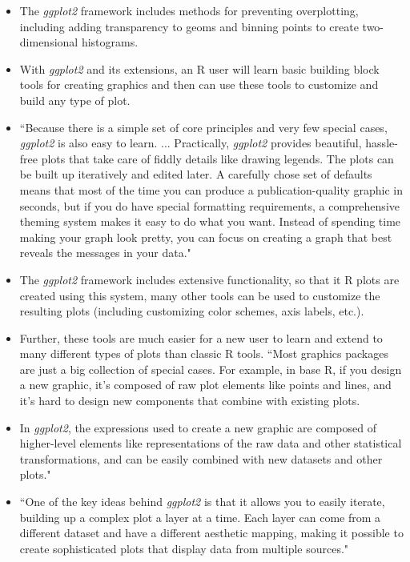 \documentclass[pdftex,english,11pt,parskip=half]{scrartcl}
\begin{document}
\begin{itemize}
\item The \textit{ggplot2} framework includes methods for preventing overplotting, including adding transparency to geoms and binning points to create two-dimensional histograms. \cite{wickham2016ggplot2} 
\item With \textit{ggplot2} and its extensions, an R user will learn basic building block tools for creating graphics and then can use these tools to customize and build any type of plot. 
\item ``Because there is a simple set of core principles and very few special cases, \textit{ggplot2} is also easy to learn. ... Practically, \textit{ggplot2} provides beautiful, hassle-free plots that take care of fiddly details like drawing legends. The plots can be built up iteratively and edited later. A carefully chose set of defaults means that most of the time you can produce a publication-quality graphic in seconds, but if you do have special formatting requirements, a comprehensive theming system makes it easy to do what you want. Instead of spending time making your graph look pretty, you can focus on creating a graph that best reveals the messages in your data." \cite{wickham2016ggplot2} 
\item The \textit{ggplot2} framework includes extensive functionality, so that it R plots are created using this system, many other tools can be used to customize the resulting plots (including customizing color schemes, axis labels, etc.). 
\item Further, these tools are much easier for a new user to learn and extend to many different types of plots than classic R tools. ``Most graphics packages are just a big collection of special cases. For example, in base R, if you design a new graphic, it's composed of raw plot elements like points and lines, and it's hard to design new components that combine with existing plots. 
\item In \textit{ggplot2}, the expressions used to create a new graphic are composed of higher-level elements like representations of the raw data and other statistical transformations, and can be easily combined with new datasets and other plots." \cite{wickham2016ggplot2} 
\item ``One of the key ideas behind \textit{ggplot2} is that it allows you to easily iterate, building up a complex plot a layer at a time. Each layer can come from a different dataset and have a different aesthetic mapping, making it possible to create sophisticated plots that display data from multiple sources." \cite{wickham2016ggplot2}

\end{itemize}
\end{document}
